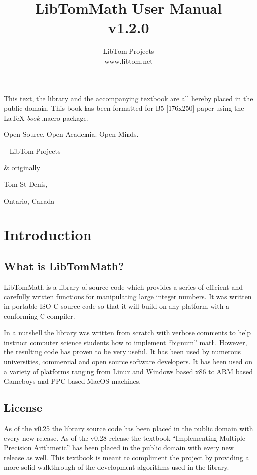 \documentclass[synpaper]{book}
\begin{document}
\frontmatter
\pagestyle{empty}
\title{LibTomMath User Manual \\ v1.2.0}
\author{LibTom Projects \\ www.libtom.net}
\maketitle
This text, the library and the accompanying textbook are all hereby placed in the public domain.
This book has been
formatted for B5 [176x250] paper using the \LaTeX{} {\em book} macro package.

\vspace{10cm}

\begin{flushright}Open Source.	Open Academia.	Open Minds.

  \mbox{ }
  LibTom Projects

  \& originally

  Tom St Denis,

  Ontario, Canada
\end{flushright}

\tableofcontents
\listoffigures
\mainmatter
\pagestyle{headings}
\chapter{Introduction}
\section{What is LibTomMath?}
LibTomMath is a library of source code which provides a series of efficient and carefully written
functions for manipulating large integer numbers. It was written in portable ISO C source code so
that it will build on any platform with a conforming C compiler.

In a nutshell the library was written from scratch with verbose comments to help instruct computer
science students how to implement ``bignum'' math.  However, the resulting code has proven to be
very useful.  It has been used by numerous universities, commercial and open source software
developers.  It has been used on a variety of platforms ranging from Linux and Windows based x86 to
ARM based Gameboys and PPC based MacOS machines.

\section{License}
As of the v0.25 the library source code has been placed in the public domain with every new
release. As of the v0.28 release the textbook ``Implementing Multiple Precision Arithmetic'' has
been placed in the public domain with every new release as well.  This textbook is meant to
compliment the project by providing a more solid walkthrough of the development algorithms used in
the library.
\end{document}

